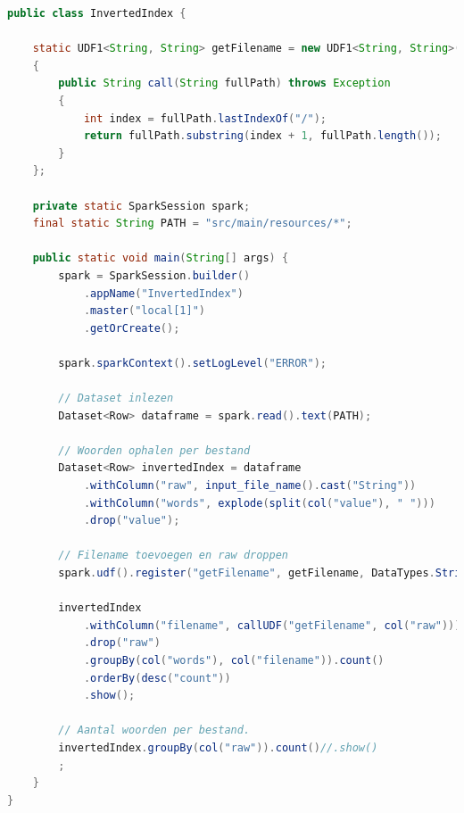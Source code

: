 \documentclass[a4paper,10pt,twoside]{report}
\begin{document}
\begin{lstlisting}[language=Java]
public class InvertedIndex {
	
	static UDF1<String, String> getFilename = new UDF1<String, String>()
	{
		public String call(String fullPath) throws Exception 
		{
			int index = fullPath.lastIndexOf("/");
			return fullPath.substring(index + 1, fullPath.length());
		}
	};
	
	private static SparkSession spark;
	final static String PATH = "src/main/resources/*";
	
	public static void main(String[] args) {
		spark = SparkSession.builder()
			.appName("InvertedIndex")
			.master("local[1]")
			.getOrCreate();
		
		spark.sparkContext().setLogLevel("ERROR");
		
		// Dataset inlezen
		Dataset<Row> dataframe = spark.read().text(PATH);
		
		// Woorden ophalen per bestand
		Dataset<Row> invertedIndex = dataframe
			.withColumn("raw", input_file_name().cast("String"))
			.withColumn("words", explode(split(col("value"), " ")))
			.drop("value");
		
		// Filename toevoegen en raw droppen
		spark.udf().register("getFilename", getFilename, DataTypes.StringType);
		
		invertedIndex
			.withColumn("filename", callUDF("getFilename", col("raw")))
			.drop("raw")
			.groupBy(col("words"), col("filename")).count()
			.orderBy(desc("count"))
			.show();
		
		// Aantal woorden per bestand.
		invertedIndex.groupBy(col("raw")).count()//.show()
		;
	}
}
\end{lstlisting}

\newpage
\end{document}
